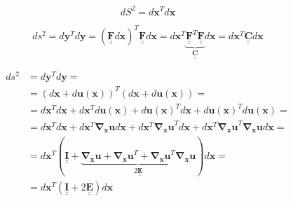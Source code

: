 \documentclass
[
a4paper,                      %
twoside,					  %
12pt,                         %
abstract,		      %
fleqn,                        %
]
{scrartcl} %
\begin{document}
\begin{equation}
dS^{2}=d\mathbf{x}^{T}d\mathbf{x}
\end{equation}

\begin{equation}
ds^{2}=d\mathbf{y}^{T}d\mathbf{y}=\left(\mathbf{\underline{\underline{F}}}d\mathbf{x}\right)^{T}\mathbf{\underline{\underline{F}}}d\mathbf{x}=
d\mathbf{x}^{T}\underbrace{\mathbf{\underline{\underline{F}}}^{T}\mathbf{\underline{\underline{F}}}}_{\mathbf{\underline{\underline{C}}}}d\mathbf{x}=d\mathbf{x}^{T}\mathbf{\underline{\underline{C}}}d\mathbf{x}
\end{equation}

\begin{equation}
\begin{aligned}
ds^{2}&=d\mathbf{y}^{T}d\mathbf{y}=\\
&=\left(d\mathbf{x}+d\mathbf{u\left(x\right)}\right)^{T}\left(d\mathbf{x}+d\mathbf{u\left(x\right)}\right)=\\
&=d\mathbf{x}^{T}d\mathbf{x}+d\mathbf{x}^{T}d\mathbf{u\left(x\right)}+d\mathbf{u\left(x\right)}^{T}d\mathbf{x}+d\mathbf{u\left(x\right)}^{T}d\mathbf{u\left(x\right)}=\\
&=d\mathbf{x}^{T}d\mathbf{x}+d\mathbf{x}^{T}\mathbf{\nabla_{x}u}d\mathbf{x}+d\mathbf{x}^{T}\mathbf{\nabla_{x}u}^{T}d\mathbf{x}+d\mathbf{x}^{T}\mathbf{\nabla_{x}u}^{T}\mathbf{\nabla_{x}u}d\mathbf{x}=\\
&=d\mathbf{x}^{T}\left(\mathbf{\underline{\underline{I}}}+\underbrace{\mathbf{\nabla_{x}u}+\mathbf{\nabla_{x}u}^{T}+\mathbf{\nabla_{x}u}^{T}\mathbf{\nabla_{x}u}}_{2\mathbf{\underline{\underline{E}}}}\right)d\mathbf{x}=\\
&=d\mathbf{x}^{T}\left(\mathbf{\underline{\underline{I}}}+2\mathbf{\underline{\underline{E}}}\right)d\mathbf{x}\\
\end{aligned}
\end{equation}
\end{document}
